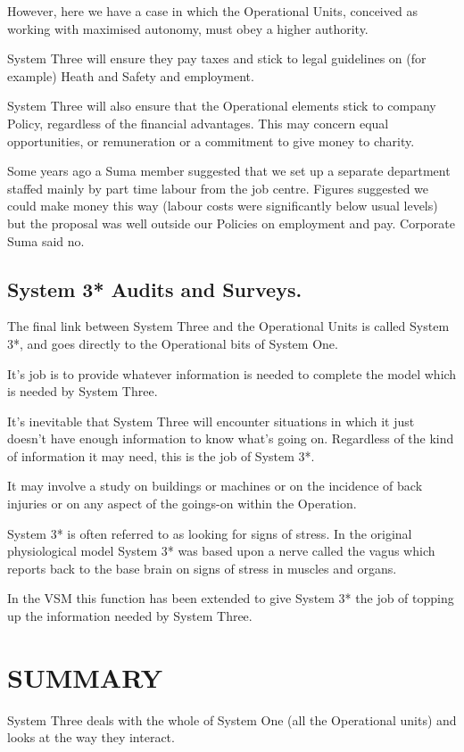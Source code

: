 However, here we have a case in which the Operational Units, conceived as working with maximised autonomy, must obey a higher authority.

System Three will ensure they pay taxes and stick to legal guidelines on (for example) Heath and Safety and employment.

System Three will also ensure that the Operational elements stick to company Policy, regardless of the financial advantages. This may concern equal opportunities, or remuneration or a commitment to give money to charity.

Some years ago a Suma member suggested that we set up a separate department staffed mainly by part time labour from the job centre. Figures suggested we could make money this way (labour costs were significantly below usual levels) but the proposal was well outside our Policies on employment and pay. Corporate Suma said no.

\subsection*{System 3* Audits and Surveys.}
The final link between System Three and the Operational Units is called System 3*, and goes directly to the Operational bits of System One.

It's job is to provide whatever information is needed to complete the model which is needed by System Three.

It's inevitable that System Three will encounter situations in which it just doesn't have enough information to know what's going on. Regardless of the kind of information it may need, this is the job of System 3*.

It may involve a study on buildings or machines or on the incidence of back injuries or on any aspect of the goings-on within the Operation.

System 3* is often referred to as looking for signs of stress. In the original physiological model System 3* was based upon a nerve called the vagus which reports back to the base brain on signs of stress in muscles and organs.

In the VSM this function has been extended to give System 3* the job of topping up the information needed by System Three.

\section*{SUMMARY}
System Three deals with the whole of System One (all the Operational units) and looks at the way they interact.

